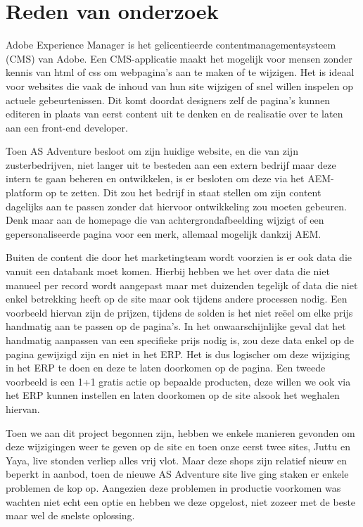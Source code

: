 \documentclass{article}
\begin{document}
	\section{Reden van onderzoek}
	Adobe Experience Manager is het gelicentieerde  contentmanagementsysteem (CMS) van Adobe. 
	Een CMS-applicatie maakt het mogelijk voor mensen zonder kennis van html of css om webpagina’s aan te maken of te wijzigen. 
	Het is ideaal voor websites die vaak de inhoud van hun site wijzigen of snel willen inspelen op actuele gebeurtenissen. 
	Dit komt doordat designers zelf de pagina’s kunnen editeren in plaats van eerst content uit te denken en de realisatie over te laten aan een front-end developer. 
	\par
	Toen AS Adventure besloot om zijn huidige website, en die van zijn zusterbedrijven, niet langer uit te besteden aan een extern bedrijf maar deze intern te gaan beheren en ontwikkelen, is er besloten om deze via het AEM-platform op te zetten. 
	Dit zou het bedrijf in staat stellen om zijn content dagelijks aan te passen zonder dat hiervoor ontwikkeling zou moeten gebeuren. 
	Denk maar aan de homepage die van achtergrondafbeelding wijzigt of een gepersonaliseerde pagina voor een merk, allemaal mogelijk dankzij AEM.
	\par
	Buiten de content die door het marketingteam wordt voorzien is er ook data die vanuit een databank moet komen. 
	Hierbij hebben we het over data die niet manueel per record wordt aangepast maar met duizenden tegelijk of data die niet enkel betrekking heeft op de site maar ook tijdens andere processen nodig. 
	Een voorbeeld hiervan zijn de prijzen, tijdens de solden is het niet reëel om elke prijs handmatig aan te passen op de pagina’s. 
	In het onwaarschijnlijke geval dat het handmatig aanpassen van een specifieke prijs nodig is, zou deze data enkel op de pagina gewijzigd zijn en niet in het ERP. 
	Het is dus logischer om deze wijziging in het ERP te doen en deze te laten doorkomen op de pagina. 
	Een tweede voorbeeld is een 1+1 gratis actie op bepaalde producten, deze willen we ook via het ERP kunnen instellen en laten doorkomen op de site alsook het weghalen hiervan.
	\par
	Toen we aan dit project begonnen zijn, hebben we enkele manieren gevonden om deze wijzigingen weer te geven op de site en toen onze eerst twee sites, Juttu en Yaya, live stonden verliep alles vrij vlot. 
	Maar deze shops zijn relatief nieuw en beperkt in aanbod, toen de nieuwe AS Adventure site live ging staken er enkele problemen de kop op. Aangezien deze problemen in productie voorkomen was wachten niet echt een optie en hebben we deze opgelost, niet zozeer met de beste maar wel de snelste oplossing.
\end{document}

